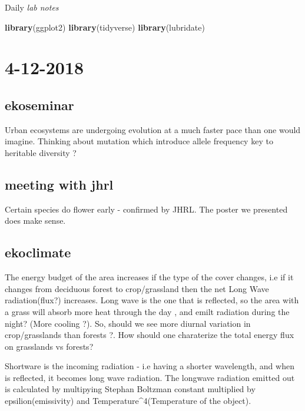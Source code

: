 \documentclass[]{book}
\newenvironment{Shaded}{\begin{snugshade}}{\end{snugshade}}
\newcommand{\KeywordTok}[1]{\textcolor[rgb]{0.13,0.29,0.53}{\textbf{#1}}}
\newcommand{\NormalTok}[1]{#1}
\theoremstyle{definition}
\theoremstyle{definition}
\theoremstyle{definition}
\theoremstyle{remark}
\begin{document}
Daily \emph{lab notes}

\begin{Shaded}
\begin{Highlighting}[]
\KeywordTok{library}\NormalTok{(ggplot2)}
\KeywordTok{library}\NormalTok{(tidyverse)}
\KeywordTok{library}\NormalTok{(lubridate)}
\end{Highlighting}
\end{Shaded}

\section{4-12-2018}\label{section}

\subsection{ekoseminar}\label{ekoseminar}

Urban ecosystems are undergoing evolution at a much faster pace than one
would imagine. Thinking about mutation which introduce allele frequency
key to heritable diversity ?

\subsection{meeting with jhrl}\label{meeting-with-jhrl}

Certain species do flower early - confirmed by JHRL. The poster we
presented does make sense.

\subsection{ekoclimate}\label{ekoclimate}

The energy budget of the area increases if the type of the cover
changes, i.e if it changes from deciduous forest to crop/grassland then
the net Long Wave radiation(flux?) increases. Long wave is the one that
is reflected, so the area with a grass will absorb more heat through the
day , and emilt radiation during the night? (More cooling ?). So, should
we see more diurnal variation in crop/grasslands than forests ?. How
should one charaterize the total energy flux on grasslands vs forests?

Shortware is the incoming radiation - i.e having a shorter wavelength,
and when is reflected, it becomes long wave radiation. The longwave
radiation emitted out is calculated by multipying Stephan Boltzman
constant multiplied by epsilion(emissivity) and
Temperature\^{}4(Temperature of the object).
\end{document}
